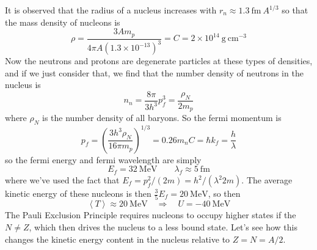 \documentclass[10pt]{article}
\numberwithin{equation}{section}
\newcommand{\avg}[1]{\left\langle#1\right\rangle}
\begin{document}
  It is observed that the radius of a nucleus increases with
  $r_n\approx 1.3\ \mathrm{fm}\ A^{1/3}$
  so that the mass density of nucleons is
  \begin{equation}
    \label{eq:374}
    \rho=\frac{3 A m_p}{4\pi A\left(1.3\times
        10^{-13}\right)^3}=C=2\times 10^{14}\ \mathrm{g\ cm^{-3}}
  \end{equation}
  Now the neutrons and protons are degenerate particles at these types
  of densities, and if we just consider that, we find that the number
  density of neutrons in the nucleus is
  \begin{equation}
    \label{eq:375}
    n_n=\frac{8\pi}{3h^3}p_f^3=\frac{\rho_N}{2m_p}
  \end{equation}
  where $\rho_N$ is the number density of all baryons. So the fermi momentum is
  \begin{equation}
    \label{eq:376}
    p_f=\left(\frac{3h^3\rho_N}{16\pi m_p}\right)^{1/3}=0.26 m_nC=\hbar k_f=\frac{h}{\lambda}
  \end{equation}
  so the fermi energy and fermi wavelength are simply
  \begin{equation}
    \label{eq:377}
    E_f=32\ \mathrm{MeV}\qquad \lambda_f\approx 5\ \mathrm{fm}
  \end{equation}
  where we've used the fact that $E_f=p_f^2/(2m)=h^2/(\lambda^2
  2m)$. The average kinetic energy of these nucleons is then
  $\frac{3}{5}E_f=20\ \mathrm{MeV}$, so then
  \begin{equation}
    \label{eq:378}
    \avg{T}\approx 20\ \mathrm{MeV}\quad\Rightarrow \quad U=-40\ \mathrm{MeV}
  \end{equation}
  The Pauli Exclusion Principle requires nucleons to occupy higher states if
  the $N\neq Z$, which then drives the nucleus to a less bound state. Let's see
  how this changes the kinetic energy content in the nucleus relative to
  $Z=N=A/2$.\\
\end{document}
